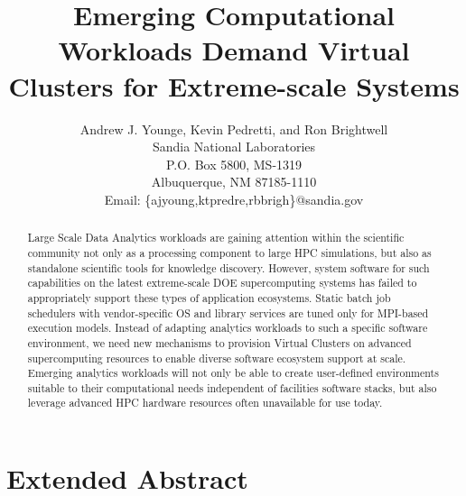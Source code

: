 
\newcommand{\AJY}[1]{{\color{red}\em  AJY: #1}}
\newcommand{\TODO}[1]{{\color{green}\em  TODO: #1}}
\newcommand{\E}[1]{{\color{red}~\blacksquare~\footnote{grammar, spelling, sentence, or other error}~}}

\newcommand{\AUTHOR}{%
Andrew J. Younge, Kevin Pedretti, and Ron Brightwell\\
Sandia National Laboratories \\
P.O. Box 5800, MS-1319 \\
Albuquerque, NM 87185-1110 \\
Email: \{ajyoung,ktpredre,rbbrigh\}@sandia.gov%
}

\newcommand{\TITLE}{Emerging Computational Workloads Demand Virtual Clusters for Extreme-scale Systems}


\title{\TITLE}
\author{\AUTHOR}

\maketitle

\begin{abstract}
Large Scale Data Analytics workloads are gaining attention within the scientific community not only as a processing component to large HPC simulations, but also as standalone scientific tools for knowledge discovery. However, system software for such capabilities on the latest extreme-scale DOE supercomputing systems has failed to appropriately support these types of application ecosystems. Static batch job schedulers with vendor-specific OS and library services are tuned only for MPI-based execution models.  Instead of adapting analytics workloads to such a specific software environment, we need new mechanisms to provision Virtual Clusters on advanced supercomputing resources to enable diverse software ecosystem support at scale.  Emerging analytics workloads will not only be able to create user-defined environments suitable to their computational needs independent of facilities software stacks, but also leverage advanced HPC hardware resources often unavailable for use today.

\end{abstract}

\section{Extended Abstract}

